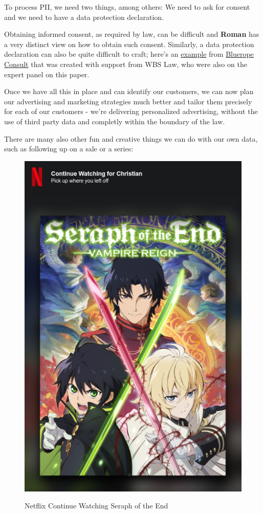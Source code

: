 To process PII, we need two things, among others: We need to ask for consent and we need to have a data protection declaration.

Obtaining informed consent, as required by law, can be difficult and \textbf{Roman} has a very distinct view on how to obtain such consent. Similarly, a data protection declaration can also be quite difficult to craft; here's an \href{https://blueropeconsultonline.de/datenschutz/}{example} from \href{https://blueropeconsultonline.de/}{Bluerope Consult} that was created with support from WBS Law, who were also on the expert panel on this paper.

Once we have all this in place and can identify our customers, we can now plan our advertising and marketing strategies much better and tailor them precisely for each of our customers - we're delivering personalized advertising, without the use of third party data and completly within the boundary of the law.

There are many also other fun and creative things we can do with our own data, such as following up on a sale or a series:

\begin{figure}[H]
\centering
\caption {Netflix Continue Watching Seraph of the End}
\includegraphics[scale=0.6]{images/continue-seraph.png}
\label{fig:seraph}
\end{figure}


